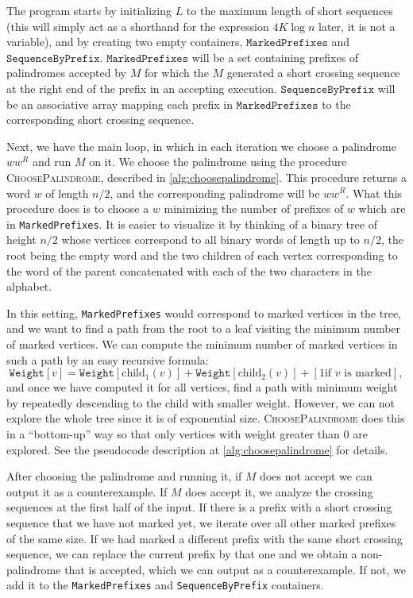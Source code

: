 The program starts by initializing $L$ to the maximum length of short sequences (this will simply act as a shorthand
for the expression $4K \log n$ later, it is not a variable), and by creating two empty containers, 
$\texttt{MarkedPrefixes}$ and $\texttt{SequenceByPrefix}$. $\texttt{MarkedPrefixes}$ will be a set
containing prefixes of palindromes accepted by $M$ for which the $M$ generated a short crossing
sequence at the right end of the prefix in an accepting execution. $\texttt{SequenceByPrefix}$ will be
an associative array mapping each prefix in $\texttt{MarkedPrefixes}$ to the corresponding 
short crossing sequence.

Next, we have the main loop, in which in each iteration we choose a palindrome $ww^R$ and run $M$ on it.  
We choose the palindrome using the procedure \textsc{ChoosePalindrome}, described in \cref{alg:choosepalindrome}. 
This procedure returns a word $w$ of length $n/2$, and the corresponding palindrome will be $ww^R$. 
What this procedure does is to choose a $w$ minimizing the number of prefixes of $w$ which are
in \texttt{MarkedPrefixes}. It is easier to visualize it by thinking of a binary tree of height $n/2$ whose
vertices correspond to all binary words of length up to $n/2$, the root being the empty word and the two children
of each vertex corresponding to the word of the parent concatenated with each of the two characters in the alphabet.

In this setting, \texttt{MarkedPrefixes} would correspond to marked vertices in the tree, and we want to find a path
from the root to a leaf visiting the minimum number of marked vertices. We can compute the minimum number of marked
vertices in such a path by an easy recursive formula: 
$$\texttt{Weight}[v] = \texttt{Weight}[\text{child}_1(v)] + \texttt{Weight}[\text{child}_2(v)] + [1 \text{if } v \text{ is marked}],$$
and once we have computed it for all vertices, find a path with minimum weight by repeatedly descending
to the child with smaller weight. However, we can not explore the whole tree since it is of exponential size.
\textsc{ChoosePalindrome} does this in a ``bottom-up'' way so that only vertices with weight greater than $0$ are
explored. See the pseudocode description at \cref{alg:choosepalindrome} for details.

After choosing the palindrome and running it, if $M$ does not accept we can output it as a counterexample.
If $M$ does accept it, we analyze the crossing sequences at the first half of the input. If there is a prefix
with a short crossing sequence that we have not marked yet, we iterate over all other marked prefixes of the same
size. If we had marked a different prefix with the same short crossing sequence, we can replace the current prefix
by that one and we obtain a non-palindrome that is accepted, which we can output as a counterexample. If not, we
add it to the \texttt{MarkedPrefixes} and \texttt{SequenceByPrefix} containers.

